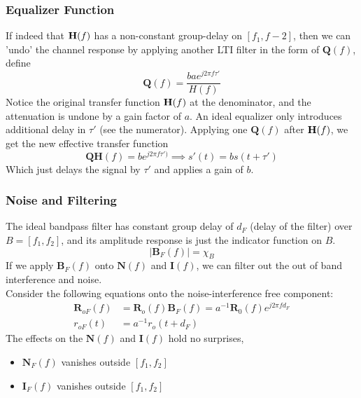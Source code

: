 \documentclass[../../main.tex]{subfiles}
\begin{document}
\subsubsection{Equalizer Function}
If indeed that $\mathbf{H}(f)$ has a non-constant group-delay on $[f_1,f-2]$, then we can 'undo' the channel response by applying another LTI filter in the form of $\mathbf{Q}(f)$, define
\[
\mathbf{Q}(f) = \dfrac{bae^{j2\pi f\tau'}}{H(f)}
\]
Notice the original transfer function $\mathbf{H}(f)$ at the denominator, and the attenuation is undone by a gain factor of $a$. An ideal equalizer only introduces additional delay in $\tau'$ (see the numerator). Applying one $\mathbf{Q}(f)$ after $\mathbf{H}(f)$, we get the new effective transfer function
\[
\mathbf{Q}\mathbf{H}(f) = be^{j2\pi f\tau')}\implies s'(t) = bs(t+\tau')
\]
Which just delays the signal by $\tau'$ and applies a gain of $b$.
\subsubsection{Noise and Filtering}
The ideal bandpass filter has constant group delay of $d_F$ (delay of the filter) over $B=[f_1,f_2]$, and its amplitude response is just the indicator function on $B$.
\[
|\mathbf{B}_F(f)| = \chi_B
\]
If we apply $\mathbf{B}_F(f)$ onto $\mathbf{N}(f)$ and $\mathbf{I}(f)$, we can filter out the out of band interference and noise. \\

Consider the following equations onto the noise-interference free component:
\begin{align}
    \mathbf{R}_{oF}(f) &= \mathbf{R}_o(f)\mathbf{B}_F(f) =a^{-1}\mathbf{R}_0(f)e^{j2\pi f d_F}\\[2ex]
    r_{oF}(t) &= a^{-1}r_o(t + d_F)\label{filter introduces additional delay}
\end{align}
The effects on the $\mathbf{N}(f)$ and $\mathbf{I}(f)$ hold no surprises,
\begin{itemize}
    \item $\mathbf{N}_F(f)$ vanishes outside $[f_1,f_2]$
    \item $\mathbf{I}_F(f)$ vanishes outside $[f_1,f_2]$
\end{itemize}
\begin{wtr}

\end{wtr}
\end{document}
